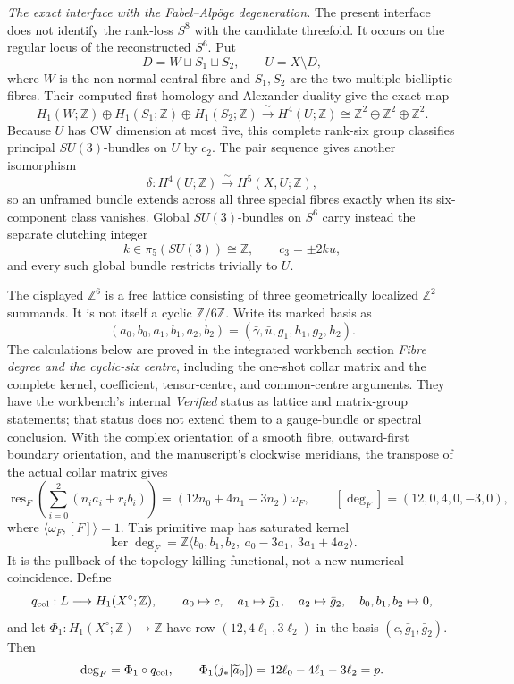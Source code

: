 \documentclass[10pt,letterpaper]{article}
\begin{document}
\medskip\noindent
\textit{The exact interface with the Fabel--Alp\"oge degeneration.}
The present interface does not identify the rank-loss \(S^8\) with the
candidate threefold.  It occurs on the regular locus of the reconstructed
\(S^6\).  Put
\[
 D=W\sqcup S_1\sqcup S_2,
 \qquad U=X\setminus D,
\]
where \(W\) is the non-normal central fibre and \(S_1,S_2\) are the two
multiple bielliptic fibres.  Their computed first homology and Alexander
duality give the exact map
\[
 \boxed{
 H_1(W;\mathbb Z)\oplus H_1(S_1;\mathbb Z)\oplus H_1(S_2;\mathbb Z)
 \xrightarrow{\ \sim\ }H^4(U;\mathbb Z)
 \cong\mathbb Z^2\oplus\mathbb Z^2\oplus\mathbb Z^2.}
\]
Because \(U\) has CW dimension at most five, this complete rank-six group
classifies principal \(SU(3)\)-bundles on \(U\) by \(c_2\).  The pair
sequence gives another isomorphism
\[
 \delta:H^4(U;\mathbb Z)\xrightarrow{\sim}H^5(X,U;\mathbb Z),
\]
so an unframed bundle extends across all three special fibres exactly when
its six-component class vanishes.  Global \(SU(3)\)-bundles on \(S^6\) carry
instead the separate clutching integer
\[
 k\in\pi_5(SU(3))\cong\mathbb Z,
 \qquad c_3=\pm2ku,
\]
and every such global bundle restricts trivially to \(U\).

The displayed \(\mathbb Z^6\) is a free lattice consisting of three
geometrically localized \(\mathbb Z^2\) summands.  It is not itself a cyclic
\(\mathbb Z/6\mathbb Z\).  Write its marked basis as
\[
 (a_0,b_0,a_1,b_1,a_2,b_2)
 =(\bar\gamma,\bar u,g_1,h_1,g_2,h_2).
\]
The calculations below are proved in the integrated workbench section
\emph{Fibre degree and the cyclic-six centre}, including the one-shot collar
matrix and the complete kernel, coefficient, tensor-centre, and common-centre
arguments.  They have the workbench's internal \emph{Verified} status as
lattice and matrix-group statements; that status does not extend them to a
gauge-bundle or spectral conclusion.
With the complex orientation of a smooth fibre, outward-first boundary
orientation, and the manuscript's clockwise meridians, the transpose of the
actual collar matrix gives
\[
 \operatorname{res}_F\!\left(\sum_{i=0}^2(n_i a_i+r_i b_i)\right)
 =(12n_0+4n_1-3n_2)\omega_F,
 \qquad
 [\deg_F]=(12,0,4,0,-3,0),
\]
where \(\langle\omega_F,[F]\rangle=1\).  This primitive map has saturated
kernel
\[
 \ker\deg_F
 =\mathbb Z\langle
 b_0,b_1,b_2,\ a_0-3a_1,\ 3a_1+4a_2
 \rangle.
\]
It is the pullback of the topology-killing functional, not a new numerical
coincidence.  Define
\[
 q_{\rm col}:L\longrightarrow H_1(X^\circ;\mathbb Z),\qquad
 a_0\mapsto c,\quad a_1\mapsto\bar g_1,\quad a_2\mapsto\bar g_2,\quad
 b_0,b_1,b_2\mapsto0,
\]
and let \(\Phi_1:H_1(X^\circ;\mathbb Z)\to\mathbb Z\) have row
\((12,4\ell_1,3\ell_2)\) in the basis
\((c,\bar g_1,\bar g_2)\).  Then
\[
 \deg_F=\Phi_1\circ q_{\rm col},\qquad
 \Phi_1(j_*[\widetilde a_0])
 =12\ell_0-4\ell_1-3\ell_2=p.
\]
\end{document}

